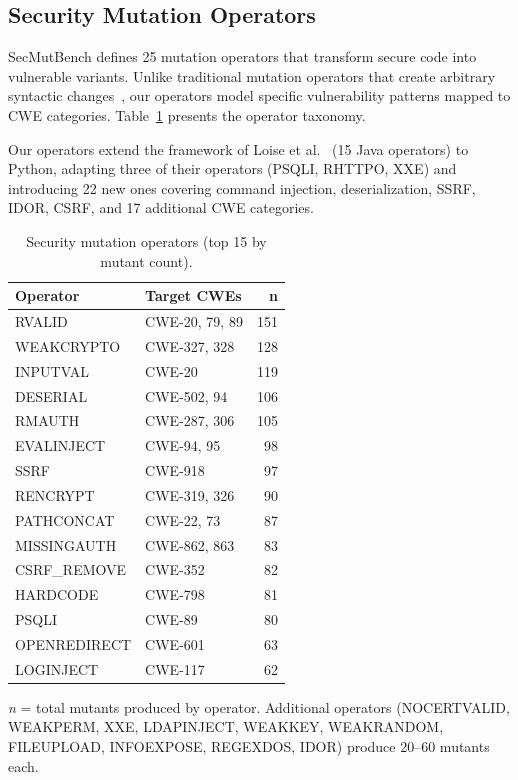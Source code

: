 \documentclass[sigconf,anonymous,review]{acmart}
\begin{document}
\subsection{Security Mutation Operators}

SecMutBench defines 25 mutation operators that transform secure code into vulnerable variants. Unlike traditional mutation operators that create arbitrary syntactic changes~\cite{demillo1978hints}, our operators model specific vulnerability patterns mapped to CWE categories. Table~\ref{tab:operators} presents the operator taxonomy.

Our operators extend the framework of Loise et al.~\cite{loise2017security} (15 Java operators) to Python, adapting three of their operators (PSQLI, RHTTPO, XXE) and introducing 22 new ones covering command injection, deserialization, SSRF, IDOR, CSRF, and 17 additional CWE categories.

\begin{table}[t]
\caption{Security mutation operators (top 15 by mutant count).}
\label{tab:operators}
\small
\begin{tabular}{llr}
\toprule
\textbf{Operator} & \textbf{Target CWEs} & \textbf{n} \\
\midrule
RVALID & CWE-20, 79, 89 & 151 \\
WEAKCRYPTO & CWE-327, 328 & 128 \\
INPUTVAL & CWE-20 & 119 \\
DESERIAL & CWE-502, 94 & 106 \\
RMAUTH & CWE-287, 306 & 105 \\
EVALINJECT & CWE-94, 95 & 98 \\
SSRF & CWE-918 & 97 \\
RENCRYPT & CWE-319, 326 & 90 \\
PATHCONCAT & CWE-22, 73 & 87 \\
MISSINGAUTH & CWE-862, 863 & 83 \\
CSRF\_REMOVE & CWE-352 & 82 \\
HARDCODE & CWE-798 & 81 \\
PSQLI & CWE-89 & 80 \\
OPENREDIRECT & CWE-601 & 63 \\
LOGINJECT & CWE-117 & 62 \\
\bottomrule
\end{tabular}
\vspace{2pt}
{\footnotesize \textit{n} = total mutants produced by operator. Additional operators (NOCERTVALID, WEAKPERM, XXE, LDAPINJECT, WEAKKEY, WEAKRANDOM, FILEUPLOAD, INFOEXPOSE, REGEXDOS, IDOR) produce 20--60 mutants each.}
\end{table}
\end{document}
